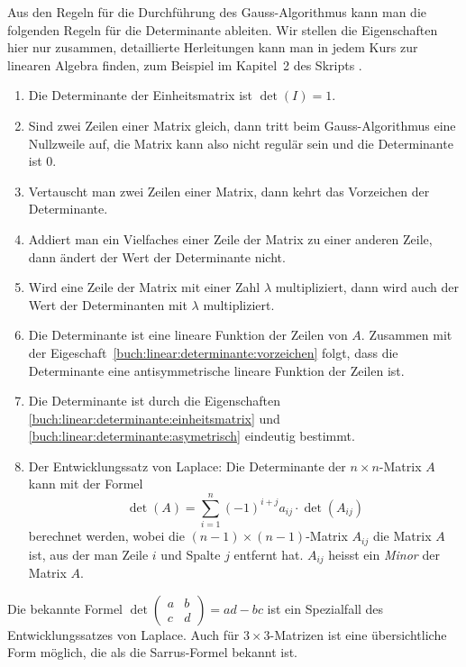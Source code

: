 Aus den Regeln für die Durchführung des Gauss-Algorithmus kann man die
folgenden Regeln für die Determinante ableiten.
Wir stellen die Eigenschaften hier nur zusammen, detaillierte Herleitungen
kann man in jedem Kurs zur linearen Algebra finden, zum Beispiel im
Kapitel~2 des Skripts \cite{buch:linalg}.
\begin{enumerate}
\item
\label{buch:linear:determinante:einheitsmatrix}
Die Determinante der Einheitsmatrix ist $\det(I)=1$.
\item
Sind zwei Zeilen einer Matrix gleich, dann tritt beim Gauss-Algorithmus
eine Nullzweile auf, die Matrix kann also nicht regulär sein und die
Determinante ist $0$.
\item
\label{buch:linear:determinante:vorzeichen}
Vertauscht man zwei Zeilen einer Matrix, dann kehrt das Vorzeichen der
Determinante.
\item
Addiert man ein Vielfaches einer Zeile der Matrix zu einer anderen Zeile,
dann ändert der Wert der Determinante nicht.
\item
Wird eine Zeile der Matrix mit einer Zahl $\lambda$ multipliziert, dann
wird auch der Wert der Determinanten mit $\lambda$ multipliziert.
\item
\label{buch:linear:determinante:asymetrisch}
Die Determinante ist eine lineare Funktion der Zeilen von $A$.
Zusammen mit der Eigeschaft~\ref{buch:linear:determinante:vorzeichen}
folgt, dass die Determinante eine antisymmetrische lineare Funktion
der Zeilen ist.
\item
Die Determinante ist durch die Eigenschaften
\ref{buch:linear:determinante:einheitsmatrix}
und
\ref{buch:linear:determinante:asymetrisch}
eindeutig bestimmt.
\item
Der Entwicklungssatz von Laplace:
%
Die Determinante der $n\times n$-Matrix $A$ kann mit der Formel
\begin{equation}
\det(A)
=
\sum_{i=1}^n (-1)^{i+j} a_{i\!j} \cdot \det(A_{i\!j})
\end{equation}
berechnet werden,
wobei die $(n-1)\times(n-1)$-Matrix $A_{i\!j}$ die Matrix $A$ ist, aus der
man Zeile $i$ und Spalte $j$ entfernt hat.
$A_{i\!j}$ heisst ein {\em Minor} der Matrix $A$.
\label{buch:linear:def:minor}
%
\end{enumerate}

Die bekannte Formel $\det\begin{pmatrix}a&b\\c&d\end{pmatrix}=ad-bc$
ist ein Spezialfall des Entwicklungssatzes von Laplace.
Auch für $3\times 3$-Matrizen ist eine übersichtliche Form möglich,
die als die Sarrus-Formel bekannt ist.
%

